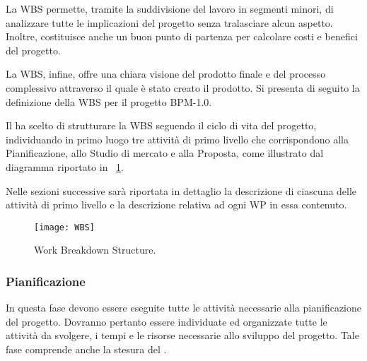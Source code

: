 La WBS permette, tramite la suddivisione del lavoro in segmenti minori, di analizzare tutte le implicazioni del progetto senza tralasciare alcun aspetto. Inoltre, costituisce anche un buon punto di partenza per calcolare costi e benefici del progetto.

La WBS, infine, offre una chiara visione del prodotto finale e del processo complessivo attraverso il quale è stato creato il prodotto. Si presenta di seguito la definizione della WBS per il progetto BPM-1.0. 

Il  ha scelto di strutturare la WBS seguendo il ciclo di vita del progetto, individuando in primo luogo tre attività di primo livello che corrispondono alla Pianificazione, allo Studio di mercato e alla Proposta, come illustrato dal diagramma riportato in \figurename~\ref{fig:WBS}. 

Nelle sezioni successive sarà riportata in dettaglio la descrizione di ciascuna delle attività di primo livello e la descrizione relativa ad ogni WP in essa contenuto. 

\begin{figure}[H]
  \centering
  \texttt{[image: WBS]}
  \caption{Work Breakdown Structure.}
  \label{fig:WBS}
\end{figure}

\subsubsection{Pianificazione}
In questa fase devono essere eseguite tutte le attività necessarie alla pianificazione del progetto.
Dovranno pertanto essere individuate ed organizzate tutte le attività da svolgere, i tempi e le risorse necessarie allo sviluppo del progetto. Tale fase comprende anche la stesura del .
		
